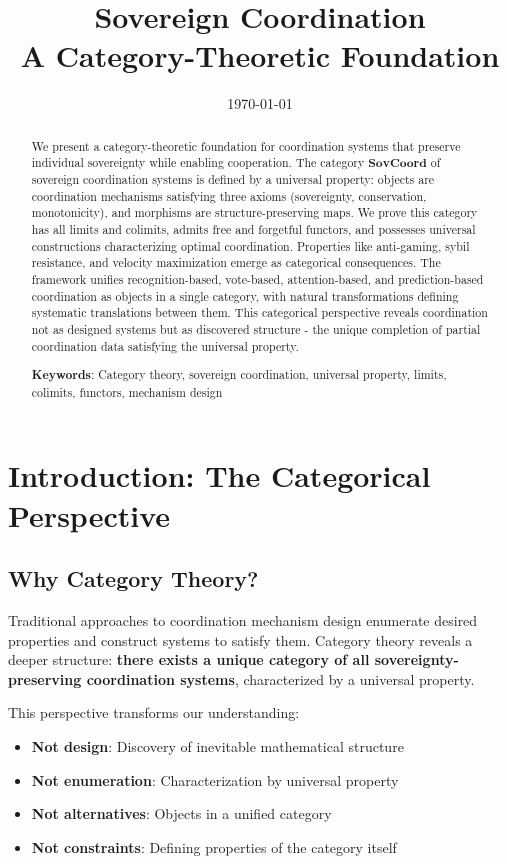 \documentclass[11pt,a4paper]{article}
\title{\textbf{Sovereign Coordination}\\
\large A Category-Theoretic Foundation}
\author{}
\date{\today}
\theoremstyle{definition}
\theoremstyle{remark}
\newcommand{\SovCoord}{\mathbf{SovCoord}}
\begin{document}
\maketitle

\begin{abstract}
We present a category-theoretic foundation for coordination systems that preserve individual sovereignty while enabling cooperation. The category $\SovCoord$ of sovereign coordination systems is defined by a universal property: objects are coordination mechanisms satisfying three axioms (sovereignty, conservation, monotonicity), and morphisms are structure-preserving maps. We prove this category has all limits and colimits, admits free and forgetful functors, and possesses universal constructions characterizing optimal coordination. Properties like anti-gaming, sybil resistance, and velocity maximization emerge as categorical consequences. The framework unifies recognition-based, vote-based, attention-based, and prediction-based coordination as objects in a single category, with natural transformations defining systematic translations between them. This categorical perspective reveals coordination not as designed systems but as discovered structure - the unique completion of partial coordination data satisfying the universal property.

\medskip

\noindent\textbf{Keywords}: Category theory, sovereign coordination, universal property, limits, colimits, functors, mechanism design
\end{abstract}

\tableofcontents
\newpage

\section{Introduction: The Categorical Perspective}

\subsection{Why Category Theory?}

Traditional approaches to coordination mechanism design enumerate desired properties and construct systems to satisfy them. Category theory reveals a deeper structure: \textbf{there exists a unique category of all sovereignty-preserving coordination systems}, characterized by a universal property.

This perspective transforms our understanding:
\begin{itemize}
\item \textbf{Not design}: Discovery of inevitable mathematical structure
\item \textbf{Not enumeration}: Characterization by universal property
\item \textbf{Not alternatives}: Objects in a unified category
\item \textbf{Not constraints}: Defining properties of the category itself
\end{itemize}
\end{document}
